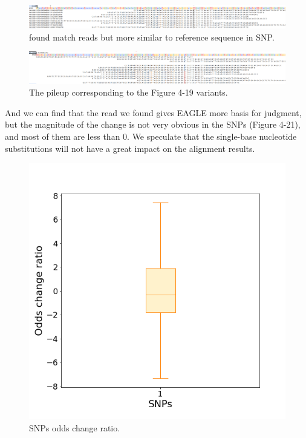 \begin{figure}[H]
    \centering
    \includegraphics[width=1\columnwidth]{body/image/4-19.png}
    \captionsetup{labelfont=bf}
    \renewcommand{\baselinestretch}{1.0}
    \vspace{-1cm}
    \caption[SNP worse match reads]{ found match reads but more similar to reference sequence in SNP.}
    \label{f4-19}
\end{figure}

\vspace{0.5cm}
\begin{figure}[H]
    \centering
    \includegraphics[width=1\columnwidth]{body/image/4-20.png}
    \captionsetup{labelfont=bf}
    \renewcommand{\baselinestretch}{1.0}
    \vspace{-1cm}
    \caption[Figure 4.19 pileup]{The pileup corresponding to the Figure 4-19 variants.}
    \label{f4-20}
\end{figure}

And we can find that the read we found gives EAGLE more basis for judgment, but the magnitude of the change is not very obvious in the SNPs (Figure 4-21), and most of them are less than 0. We speculate that the single-base nucleotide substitutions will not have a great impact on the alignment results.

\vspace{1cm}
\begin{figure}[H]
    \centering
    \includegraphics[width=0.6\columnwidth]{body/image/4-21.png}
    \captionsetup{labelfont=bf}
    \renewcommand{\baselinestretch}{1.0}
    \caption[SNPs odds change ratio]{SNPs odds change ratio.}
    \label{f4-21}
\end{figure}

